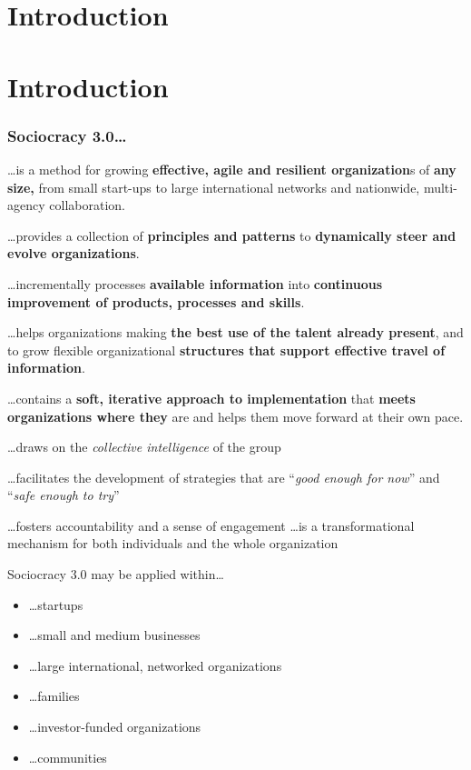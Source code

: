 \part{Introduction}
\label{introduction}

\part{Introduction}
\label{introduction}

\section{Sociocracy 3.0{\ldots}}
\label{sociocracy3.0...}

{\ldots}is a method for growing \textbf{effective, agile and resilient organization}s of \textbf{any size,} from small start-ups to large international networks and nationwide, multi-agency collaboration.

{\ldots}provides a collection of \textbf{principles and patterns} to \textbf{dynamically steer and evolve organizations}.

{\ldots}incrementally processes \textbf{available information} into \textbf{continuous improvement of products, processes and skills}.

{\ldots}helps organizations making \textbf{the best use of the talent already present}, and to grow flexible organizational \textbf{structures that support effective travel of information}.

{\ldots}contains a \textbf{soft, iterative approach to implementation} that \textbf{meets organizations where they} are and helps them move forward at their own pace.

{\ldots}draws on the \emph{collective intelligence} of the group

{\ldots}facilitates the development of strategies that are “\emph{good enough for now}” and “\emph{safe enough to try}”

{\ldots}fosters accountability and a sense of engagement
{\ldots}is a transformational mechanism for both individuals and the whole organization

Sociocracy 3.0 may be applied within{\ldots}

\begin{itemize}
\item {\ldots}startups

\item {\ldots}small and medium businesses

\item {\ldots}large international, networked organizations

\item {\ldots}families

\item {\ldots}investor-funded organizations

\item {\ldots}communities

\end{itemize}

